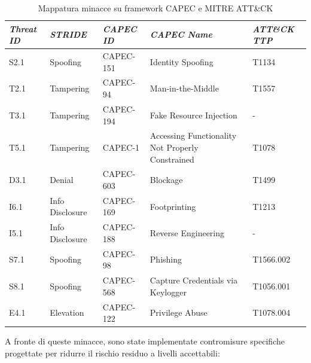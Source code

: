 \begin{table}[H]
\centering
\caption{Mappatura minacce su framework CAPEC e MITRE ATT\&CK}
\label{tab:capec-mapping}
\begin{tabularx}{\textwidth}{l l l L l}
\toprule
\textit{Threat ID} & \textit{STRIDE} & \textit{CAPEC ID} & \textit{CAPEC Name} & \textit{ATT\&CK TTP} \\
\midrule
S2.1 & Spoofing & CAPEC-151 & Identity Spoofing & T1134 \\
T2.1 & Tampering & CAPEC-94 & Man-in-the-Middle & T1557 \\
T3.1 & Tampering & CAPEC-194 & Fake Resource Injection & - \\
T5.1 & Tampering & CAPEC-1 & Accessing Functionality Not Properly Constrained & T1078 \\
D3.1 & Denial & CAPEC-603 & Blockage & T1499 \\
I6.1 & Info Disclosure & CAPEC-169 & Footprinting & T1213 \\
I5.1 & Info Disclosure & CAPEC-188 & Reverse Engineering & - \\
S7.1 & Spoofing & CAPEC-98 & Phishing & T1566.002 \\
S8.1 & Spoofing & CAPEC-568 & Capture Credentials via Keylogger & T1056.001 \\
E4.1 & Elevation & CAPEC-122 & Privilege Abuse & T1078.004 \\
\bottomrule
\end{tabularx}
\end{table}

\vspace{1em}
A fronte di queste minacce, sono state implementate contromisure specifiche progettate per ridurre il rischio residuo a livelli accettabili:

